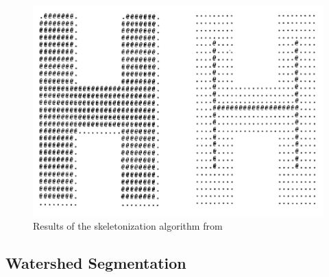 \begin{figure}[H]
  \includegraphics{gfx/skeletonization.png}
  \caption{Results of the skeletonization algorithm from \cite{zhang1984fast}}
  \label{fig:skeletonization-example}
\end{figure}


\subsection{Watershed Segmentation}

